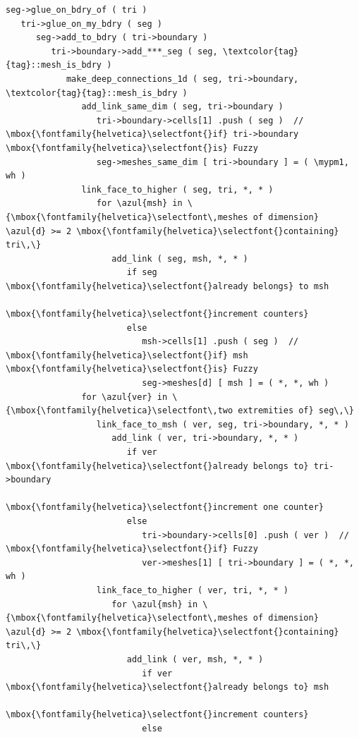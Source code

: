 \def\mypm{$\pm$}
\begin{Verbatim}[commandchars=\\\{\},formatcom=\small\tt,baselinestretch=0.94]
seg->glue_on_bdry_of ( tri )
   tri->glue_on_my_bdry ( seg )
      seg->add_to_bdry ( tri->boundary )
         tri->boundary->add_***_seg ( seg, \textcolor{tag}{tag}::mesh_is_bdry )
            make_deep_connections_1d ( seg, tri->boundary, \textcolor{tag}{tag}::mesh_is_bdry )
               add_link_same_dim ( seg, tri->boundary )
                  tri->boundary->cells[1] .push ( seg )  // \mbox{\fontfamily{helvetica}\selectfont{}if} tri->boundary \mbox{\fontfamily{helvetica}\selectfont{}is} Fuzzy
                  seg->meshes_same_dim [ tri->boundary ] = ( \mypm1, wh )
               link_face_to_higher ( seg, tri, *, * )
                  for \azul{msh} in \{\mbox{\fontfamily{helvetica}\selectfont\,meshes of dimension} \azul{d} >= 2 \mbox{\fontfamily{helvetica}\selectfont{}containing} tri\,\}
                     add_link ( seg, msh, *, * )
                        if seg \mbox{\fontfamily{helvetica}\selectfont{}already belongs} to msh
                           \mbox{\fontfamily{helvetica}\selectfont{}increment counters}
                        else
                           msh->cells[1] .push ( seg )  // \mbox{\fontfamily{helvetica}\selectfont{}if} msh \mbox{\fontfamily{helvetica}\selectfont{}is} Fuzzy
                           seg->meshes[d] [ msh ] = ( *, *, wh )
               for \azul{ver} in \{\mbox{\fontfamily{helvetica}\selectfont\,two extremities of} seg\,\}
                  link_face_to_msh ( ver, seg, tri->boundary, *, * )
                     add_link ( ver, tri->boundary, *, * )
                        if ver \mbox{\fontfamily{helvetica}\selectfont{}already belongs to} tri->boundary
                           \mbox{\fontfamily{helvetica}\selectfont{}increment one counter}
                        else
                           tri->boundary->cells[0] .push ( ver )  // \mbox{\fontfamily{helvetica}\selectfont{}if} Fuzzy
                           ver->meshes[1] [ tri->boundary ] = ( *, *, wh )
                  link_face_to_higher ( ver, tri, *, * )
                     for \azul{msh} in \{\mbox{\fontfamily{helvetica}\selectfont\,meshes of dimension} \azul{d} >= 2 \mbox{\fontfamily{helvetica}\selectfont{}containing} tri\,\}
                        add_link ( ver, msh, *, * )
                           if ver \mbox{\fontfamily{helvetica}\selectfont{}already belongs to} msh
                              \mbox{\fontfamily{helvetica}\selectfont{}increment counters}
                           else

\end{Verbatim}
